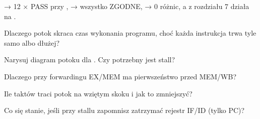\begin{gotowe}
 → 12 × PASS przy ,  → wszystko
ZGODNE,  → 0 różnic, a  z rozdziału 7 działa na
.
\end{gotowe}

\begin{kontrolne}
  \item Dlaczego potok skraca czas wykonania programu, choć każda instrukcja trwa tyle samo albo dłużej?
  \item Narysuj diagram potoku dla . Czy potrzebny jest stall?
  \item Dlaczego przy forwardingu EX/MEM ma pierwszeństwo przed MEM/WB?
  \item Ile taktów traci potok na wziętym skoku i jak to zmniejszyć?
  \item Co się stanie, jeśli przy stallu zapomnisz zatrzymać rejestr IF/ID (tylko PC)?
\end{kontrolne}
